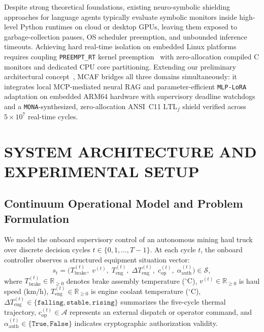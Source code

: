 \documentclass{ieeeaccess}
\begin{document}
Despite strong theoretical foundations, existing neuro-symbolic shielding approaches for language agents typically evaluate symbolic monitors inside high-level Python runtimes on cloud or desktop GPUs, leaving them exposed to garbage-collection pauses, OS scheduler preemption, and unbounded inference timeouts. Achieving hard real-time isolation on embedded Linux platforms requires coupling \texttt{PREEMPT\_RT} kernel preemption~\cite{reghenzani2019rt} with zero-allocation compiled C monitors and dedicated CPU core partitioning. Extending our preliminary architectural concept~\cite{andrade2026mcaf}, MCAF bridges all three domains simultaneously: it integrates local MCP-mediated neural RAG and parameter-efficient \texttt{MLP-LoRA} adaptation on embedded ARM64 hardware with supervisory deadline watchdogs and a \texttt{MONA}-synthesized, zero-allocation ANSI~C11 $\mathrm{LTL}_f$ shield verified across $5 \times 10^7$ real-time cycles.

\section{SYSTEM ARCHITECTURE AND EXPERIMENTAL SETUP}
\label{sec:arch}

\subsection{Continuum Operational Model and Problem Formulation}
We model the onboard supervisory control of an autonomous mining haul truck over discrete decision cycles $t \in \{0, 1, \dots, T-1\}$. At each cycle $t$, the onboard controller observes a structured equipment situation vector:
\begin{equation}
    s_t = \bigl(T_{\mathrm{brake}}^{(t)},\; v^{(t)},\; T_{\mathrm{eng}}^{(t)},\; \Delta T_{\mathrm{eng}}^{(t)},\; c_{\mathrm{op}}^{(t)},\; \alpha_{\mathrm{auth}}^{(t)}\bigr) \in \mathcal{S},
    \label{eq:state_vector}
\end{equation}
where $T_{\mathrm{brake}}^{(t)} \in \mathbb{R}_{\ge 0}$ denotes brake assembly temperature ($^\circ\text{C}$), $v^{(t)} \in \mathbb{R}_{\ge 0}$ is haul speed ($\text{km/h}$), $T_{\mathrm{eng}}^{(t)} \in \mathbb{R}_{\ge 0}$ is engine coolant temperature ($^\circ\text{C}$), $\Delta T_{\mathrm{eng}}^{(t)} \in \{\texttt{falling}, \texttt{stable}, \texttt{rising}\}$ summarizes the five-cycle thermal trajectory, $c_{\mathrm{op}}^{(t)} \in \mathcal{A}$ represents an external dispatch or operator command, and $\alpha_{\mathrm{auth}}^{(t)} \in \{\texttt{True}, \texttt{False}\}$ indicates cryptographic authorization validity.
\end{document}
